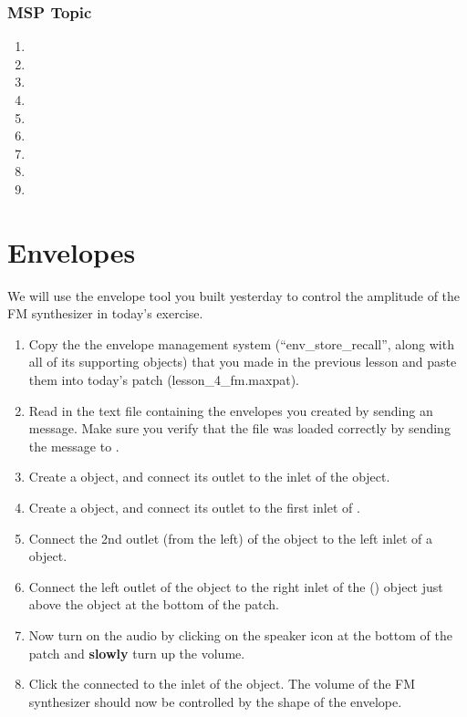 \subsubsection*{MSP Topic}
\begin{enumerate}
\item {}
\item {}
\item {}
\item {}
\item {}
\item {}
\item {}
\item {}
\item {}
\end{enumerate}

\section{Envelopes}\label{sec:envelopes}

We will use the envelope tool you built yesterday to control the amplitude of the FM
synthesizer in today's exercise.

\begin{enumerate}
\item Copy the the envelope management system (``env\_store\_recall'', along with all of its supporting objects) that you made in the previous lesson and paste them into today's patch (lesson\_4\_fm.maxpat).  
\item Read in the text file containing the envelopes you created by sending
 an  message.
Make sure you verify that the file was loaded correctly by sending the  message
to .
\item Create a  object, and connect its outlet to the inlet of the  object.
\item Create a  object, and connect its outlet to the first inlet of .
\item Connect the 2nd outlet (from the left) of the  object to the left inlet of a  object.
\item Connect the left outlet of the  object to the right inlet of the  () object just above the  object at the bottom of the patch.
\item Now turn on the audio by clicking on the speaker icon at the bottom of the patch and 
\textbf{slowly} turn up the volume.
\item Click the  connected to the inlet of the  object.  The volume of the
FM synthesizer should now be controlled by the shape of the envelope.
\end{enumerate}

